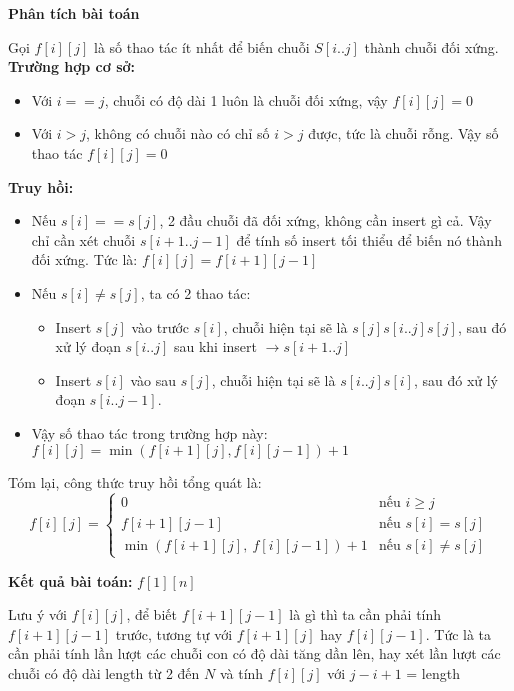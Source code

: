 \textbf{Phân tích bài toán}

Gọi $f[i][j]$ là số thao tác ít nhất để biến chuỗi $S[i..j]$ thành chuỗi đối xứng.\\

\textbf{Trường hợp cơ sở:}
\begin{itemize}
    \item Với $i == j$, chuỗi có độ dài 1 luôn là chuỗi đối xứng, vậy $f[i][j] = 0$
    \item Với $i > j$, không có chuỗi nào có chỉ số $i > j$ được, tức là chuỗi rỗng. Vậy số thao tác $f[i][j] = 0$
\end{itemize}

\textbf{Truy hồi:}
\begin{itemize}
    \item Nếu $s[i] == s[j]$, 2 đầu chuỗi đã đối xứng, không cần insert gì cả. Vậy chỉ cần xét chuỗi $s[i + 1 .. j - 1]$ để tính số insert tối thiểu để biến nó thành đối xứng. Tức là: $f[i][j] = f[i + 1][j - 1]$
    \item Nếu $s[i] \neq s[j]$, ta có 2 thao tác:
    \begin{itemize}
        \item Insert $s[j]$ vào trước $s[i]$, chuỗi hiện tại sẽ là $s[j]s[i..j]s[j]$, sau đó xử lý đoạn $s[i..j]$ sau khi insert $\rightarrow s[i + 1..j]$
        \item Insert $s[i]$ vào sau $s[j]$, chuỗi hiện tại sẽ là $s[i..j]s[i]$, sau đó xử lý đoạn $s[i..j-1]$.
    \end{itemize}
    \item Vậy số thao tác trong trường hợp này: $f[i][j] = \min(f[i + 1][j], f[i][j - 1]) + 1$
\end{itemize}

Tóm lại, công thức truy hồi tổng quát là:
\[
f[i][j] =
\begin{cases}
0 & \text{nếu } i \geq j \\
f[i+1][j-1] & \text{nếu } s[i] = s[j] \\
\min \left( f[i+1][j],\ f[i][j-1] \right) + 1 & \text{nếu } s[i] \neq s[j]
\end{cases}
\]

\textbf{Kết quả bài toán:} $f[1][n]$ 

Lưu ý với $f[i][j]$, để biết $f[i + 1][j - 1]$ là gì thì ta cần phải tính $f[i + 1][j - 1]$ trước, tương tự với $f[i + 1][j]$ hay $f[i][j - 1]$. Tức là ta cần phải tính lần lượt các chuỗi con có độ dài tăng dần lên, hay xét lần lượt các chuỗi có độ dài length từ 2 đến $N$ và tính $f[i][j]$ với $j - i + 1$ = length \\


